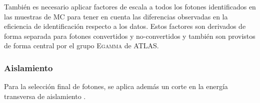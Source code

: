 También es necesario aplicar factores de escala a todos los fotones
identificados en las muestras de MC para tener en cuenta las diferencias
observadas en la eficiencia de identificación respecto a los datos. Estos
factores son derivados de forma separada para fotones convertidos y
no-convertidos y también son provistos de forma central por el grupo
\textsc{Egamma} de ATLAS.


\subsubsection{Aislamiento}

Para la selección final de fotones, se aplica además un corte en la energía
transversa de aislamiento {\etiso}.









